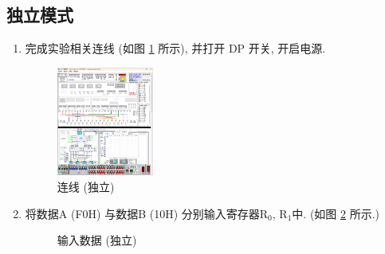 \documentclass[../main.tex]{subfiles}
\begin{document}
\subsection{独立模式}

\begin{enumerate}

    \item 完成实验相关连线 (如图 \ref{fig:1.3} 所示), 并打开 DP 开关, 开启电源.

          \begin{figure}[hp]
              \centering
              \includegraphics[width=0.3\textwidth]{screenshots/1.2.1.png}
              \caption{连线 (独立)}
              \label{fig:1.3}
          \end{figure}

    \item 将数据A (F0H) 与数据B (10H) 分别输入寄存器R$_0$, R$_1$中. (如图 \ref{fig:1.4} 所示.)

          \begin{figure}[hp]
              \centering
              \caption{输入数据 (独立)}
              \label{fig:1.4}
          \end{figure}


\end{enumerate}
\end{document}
